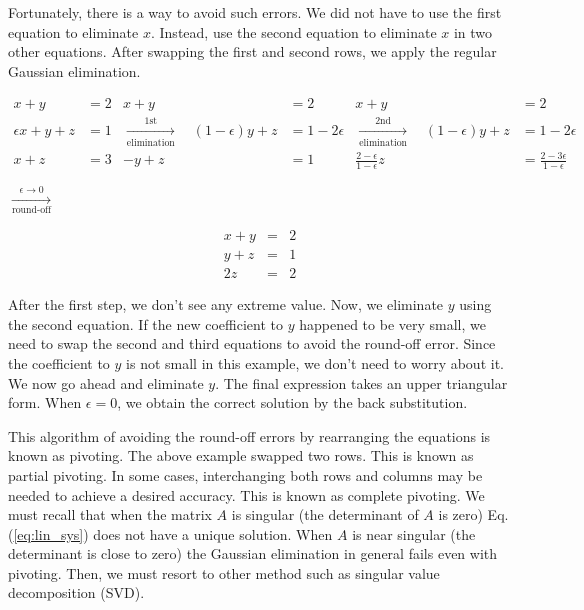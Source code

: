 Fortunately, there is a way to avoid such errors.  We did not have to use the first equation to eliminate $x$. Instead, use the second equation to eliminate $x$ in two other equations.  After swapping the first and second rows, we apply the regular Gaussian elimination.

\small
\begin{align*}
x + y &= 2 &  x + y &= 2  & x + y &= 2  \\
\epsilon x + y + z &= 1 & \xrightarrow[\text{elimination}]{\text{1st}} \quad (1-\epsilon) y + z &= 1 - 2 \epsilon & \xrightarrow[\text{elimination}]{\text{2nd}} \quad (1-\epsilon) y + z &= 1 - 2 \epsilon \\
x + z &= 3 & -y + z &= 1 & \frac{2-\epsilon}{1-\epsilon} z &= \frac{2-3\epsilon}{1-\epsilon}
\end{align*}
\normalsize

\begin{center}
$\xrightarrow[\text{round-off}]{\epsilon \rightarrow 0}$
\begin{minipage}[m]{0.4\textwidth}
\small
\begin{subequations}
\begin{eqnarray*}
x + y &=& 2 \\
y + z &=& 1 \\
2 z &=& 2
\end{eqnarray*}
\end{subequations}
\end{minipage}
\end{center}


\medskip
\noindent
After the first step, we don't see any extreme value.
Now, we eliminate $y$ using the second equation.   If the new coefficient to $y$ happened to be very small, we need to swap the second and third equations to avoid the round-off error.   Since the coefficient to $y$ is not small in this example, we don't need to worry about it.  We now go ahead and eliminate $y$. The final expression takes an upper triangular form. When $\epsilon=0$, we obtain the correct solution by the back substitution.

This algorithm of avoiding the round-off errors by rearranging the equations is known as pivoting.  The above example swapped two rows.  This is known as partial pivoting.  In some cases, interchanging both rows and columns may be needed to achieve a desired accuracy. This is known as complete pivoting. We must recall that when the matrix $A$ is singular (the determinant of $A$ is zero) Eq. (\ref{eq:lin_sys}) does not have a unique solution.  When $A$ is near singular (the determinant is close to zero) the Gaussian elimination in general fails even with pivoting. Then, we must resort to other method such as singular value decomposition (SVD)\cite{matrix_comp}.

